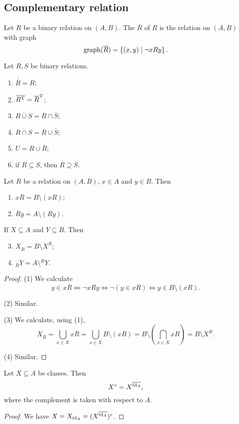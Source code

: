 \subsection{Complementary relation}
\begin{definition}
Let $R$ be a binary relation on $(A, B)$. The  $\overline{R}$ of $R$ is the relation on $(A, B)$ with graph
\[ \operatorname{graph}(\overline{R}) = \left\{ (x,y) \;\middle|\; \neg xRy \right\}. \]
\end{definition}
\begin{lemma} \label{relationalComplementProperties}
Let $R,S$ be binary relations.
\begin{enumerate}
\item $\overline{\overline{R}} = R$;
\item $\overline{R^{\mathrm{T}}} = \overline{R}^{\mathrm{T}}$;
\item $\overline{R\cup S} = \overline{R}\cap \overline{S}$;
\item $\overline{R\cap S} = \overline{R}\cup \overline{S}$;
\item $U = R \cup \overline{R}$;
\item if $R \subseteq S$, then $\overline{R} \supseteq \overline{S}$.
\end{enumerate}
\end{lemma}


\begin{lemma} \label{imageComplementaryRelation}
Let $R$ be a relation on $(A,B)$, $x\in A$ and $y\in B$. Then
\begin{enumerate}
\item $x\overline{R} = B\setminus (xR)$;
\item $\overline{R}y = A\setminus (Ry)$.
\end{enumerate}
If $X\subseteq A$ and $Y\subseteq B$. Then
\begin{enumerate} \setcounter{enumi}{2}
\item $X_{\overline{R}} = B\setminus X^R$;
\item $_{\overline{R}}Y = A\setminus {^RY}$.
\end{enumerate}
\end{lemma}
\begin{proof}
(1) We calculate
\[ y \in x\overline{R} \iff \neg xRy \iff \neg (y\in xR) \iff y\in B\setminus (xR). \]

(2) Similar.

(3) We calculate, using (1),
\[ X_{\overline{R}} = \bigcup_{x\in X}x\overline{R} = \bigcup_{x\in X}B\setminus (xR) = B\setminus \left(\bigcap_{x\in X}xR\right) = B\setminus X^R. \]

(4) Similar.
\end{proof}
\begin{corollary}
Let $X\subseteq A$ be classes. Then
\[ X^c = X^{\overline{\operatorname{id}_A}}, \]
where the complement is taken with respect to $A$.
\end{corollary}
\begin{proof}
We have $X = X_{\operatorname{id}_A} = (X^{\overline{\operatorname{id}_A}})^c$.
\end{proof}

